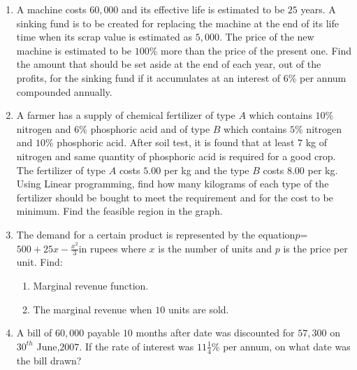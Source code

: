 \documentclass[12pt,-letter paper]{article}
\begin{document}
\begin{enumerate}
	\item A machine costs \rupee $60,000$ and its effective life is estimated to be $25$ years. A sinking fund is to be created for replacing the machine at the end of its life time when its scrap value is estimated as \rupee $5,000$. The price of the new machine is estimated to be $100$\% more than the price of the present one. Find the amount that should be set aside at the end of each year, out of the profits, for the sinking fund if it accumulates at an interest of $6$\% per annum compounded annually. 
	\item A farmer has a supply of chemical fertilizer of type $A$ which contains $10$\% nitrogen and $6$\% phosphoric acid and of type $B$ which contains $5$\% nitrogen and $10$\% phosphoric acid. After soil test, it is found that at least $7$ kg of nitrogen and same quantity of phosphoric acid is required for a good crop. The fertilizer of type $A$ costs \rupee $ 5.00$ per kg and the type $B$ costs \rupee $8.00$ per kg. Using Linear programming, find how many kilograms of each type of the fertilizer should be bought to meet the requirement and for the cost to be minimum. Find the feasible region in the graph.
	\item The demand for a certain product is represented by the equation$p$=$500+25x-\frac{x^2}{3}$in rupees where $x$ is the number of units and $p$ is the price per unit. Find: 
		\begin{enumerate}
\item Marginal revenue function. 
\item  The marginal revenue when $10$ units are sold.
		\end{enumerate}
	\item A bill of \rupee $60,000$ payable $10$ months after date was discounted for \rupee $ 57,300$ on $30^{th}$ June,$2007$. If the rate of interest was $11$$\frac{1}{4}$\% per annum, on what date was the bill drawn?

\end{enumerate}
\end{document}
